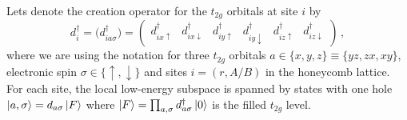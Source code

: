 Lets denote the creation operator for the $t_{2g}$ orbitals at site $i$ by
\begin{equation}
    d_{i}^{\dagger} = \Big( d_{ia\sigma}^{\dagger} \Big) = \left( \begin{array}{cccccc} d_{i x  \uparrow}^{\dagger}&d_{i x  \downarrow}^{\dagger}&
    d_{i y  \uparrow}^{\dagger}&d_{i y  \downarrow}^{\dagger}&
    d_{i z  \uparrow}^{\dagger}&d_{i z  \downarrow}^{\dagger}    \end{array} \right)
 \, ,
\end{equation}
where we are using the notation for three $t_{2g}$ orbitals $a \in \{ x,y,z \} \equiv \{ yz, zx, xy\} $, electronic spin $\sigma \in \{ \uparrow, \downarrow \}$ and sites $i=(r,A/B)$ in the honeycomb lattice. For each site, the local low-energy subspace is spanned by states with one hole $\ket{a,\sigma} = d_{a\sigma}\ket{F}$ where $\ket{F}=\prod_{a,\sigma}d^\dagger_{a \sigma}\ket{0}$ is the filled $t_{2g}$ level.

